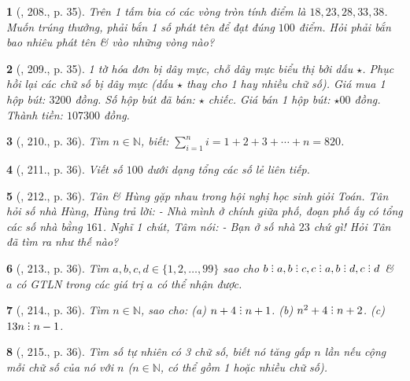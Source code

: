 \documentclass{article}
\newtheorem{baitoan}{}
\DeclareRobustCommand{\divby}{%
	\mathrel{\vbox{\baselineskip.65ex\lineskiplimit0pt\hbox{.}\hbox{.}\hbox{.}}}%
}
\begin{document}
\begin{baitoan}[\cite{Binh_Toan_6_tap_1}, 208., p. 35]
	Trên 1 tấm bia có các vòng tròn tính điểm là $18,23,28,33,38$. Muốn trúng thưởng, phải bắn 1 số phát tên để đạt đúng $100$ điểm. Hỏi phải bắn bao nhiêu phát tên \& vào những vòng nào?
\end{baitoan}

\begin{baitoan}[\cite{Binh_Toan_6_tap_1}, 209., p. 35]
	1 tờ hóa đơn bị dây mực, chỗ dây mực biểu thị bởi dấu $\star$. Phục hồi lại các chữ số bị dây mực (dấu $\star$ thay cho 1 hay nhiều chữ số). Giá mua 1 hộp bút: $3200$ đồng. Số hộp bút đã bán: $\star$ chiếc. Giá bán 1 hộp bút: $\star00$ đồng. Thành tiền: $107300$ đồng.
\end{baitoan}

\begin{baitoan}[\cite{Binh_Toan_6_tap_1}, 210., p. 36]
	Tìm $n\in\mathbb{N}$, biết: $\sum_{i=1}^n i = 1 + 2 + 3 + \cdots + n = 820$.
\end{baitoan}

\begin{baitoan}[\cite{Binh_Toan_6_tap_1}, 211., p. 36]
	Viết số $100$ dưới dạng tổng các số lẻ liên tiếp.
\end{baitoan}

\begin{baitoan}[\cite{Binh_Toan_6_tap_1}, 212., p. 36]
	Tân \& Hùng gặp nhau trong hội nghị học sinh giỏi Toán. Tân hỏi số nhà Hùng, Hùng trả lời: - Nhà mình ở chính giữa phố, đoạn phố ấy có tổng các số nhà bằng $161$. Nghĩ 1 chút, Tâm nói: - Bạn ở số nhà $23$ chứ gì! Hỏi Tân đã tìm ra như thế nào?
\end{baitoan}

\begin{baitoan}[\cite{Binh_Toan_6_tap_1}, 213., p. 36]
	Tìm $a,b,c,d\in\{1,2,\ldots,99\}$ sao cho $b\divby a,b\divby c,c\divby a,b\divby d,c\divby d$ \& $a$ có {\rm GTLN} trong các giá trị $a$ có thể nhận được.
\end{baitoan}

\begin{baitoan}[\cite{Binh_Toan_6_tap_1}, 214., p. 36]
	Tìm $n\in\mathbb{N}$, sao cho: (a) $n + 4\divby n + 1$. (b) $n^2 + 4\divby n + 2$. (c) $13n\divby n - 1$.
\end{baitoan}

\begin{baitoan}[\cite{Binh_Toan_6_tap_1}, 215., p. 36]
	Tìm số tự nhiên có 3 chữ số, biết nó tăng gấp $n$ lần nếu cộng mỗi chữ số của nó với $n$ ($n\in\mathbb{N}$, có thể gồm 1 hoặc nhiều chữ số).
\end{baitoan}
\end{document}
